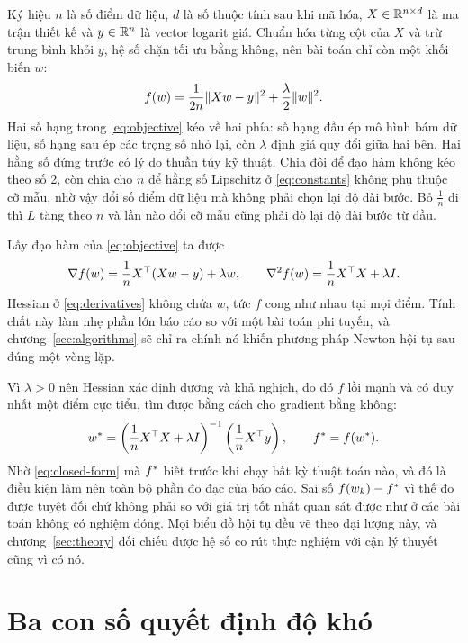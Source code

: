 Ký hiệu $n$ là số điểm dữ liệu, $d$ là số thuộc tính sau khi mã hóa,
$X \in \mathbb{R}^{n \times d}$ là ma trận thiết kế và $y \in \mathbb{R}^{n}$ là vector logarit
giá. Chuẩn hóa từng cột của $X$ và trừ trung bình khỏi $y$, hệ số chặn tối ưu
bằng không, nên bài toán chỉ còn một khối biến $w$:
%
\begin{equation}
  \label{eq:objective}
  f(w) = \frac{1}{2n} \lVert Xw - y\rVert^{2} + \frac{\lambda}{2} \lVert w\rVert^{2}.
\end{equation}
%
Hai số hạng trong \eqref{eq:objective} kéo về hai phía: số hạng đầu ép mô hình
bám dữ liệu, số hạng sau ép các trọng số nhỏ lại, còn $\lambda$ định giá quy đổi
giữa hai bên. Hai hằng số đứng trước có lý do thuần túy kỹ thuật. Chia đôi để
đạo hàm
không kéo theo số 2, còn chia cho $n$ để hằng số Lipschitz ở \eqref{eq:constants}
không phụ thuộc cỡ mẫu, nhờ vậy đổi số điểm dữ liệu mà không phải chọn lại độ dài
bước. Bỏ $\tfrac{1}{n}$ đi thì $L$ tăng theo $n$ và lần nào đổi cỡ mẫu cũng phải
dò lại độ dài bước từ đầu.

Lấy đạo hàm của \eqref{eq:objective} ta được
%
\begin{equation}
  \label{eq:derivatives}
  \nabla f(w) = \frac{1}{n} X^{\top} (Xw - y) + \lambda w,
  \qquad
  \nabla^{2} f(w) = \frac{1}{n} X^{\top} X + \lambda I.
\end{equation}
%
Hessian ở \eqref{eq:derivatives} không chứa $w$, tức $f$ cong như nhau tại mọi
điểm. Tính chất này làm nhẹ phần lớn báo cáo so với một bài toán phi tuyến, và
chương~\ref{sec:algorithms} sẽ chỉ ra chính nó khiến phương pháp Newton hội tụ
sau đúng một vòng lặp.

Vì $\lambda > 0$ nên Hessian xác định dương và khả nghịch, do đó $f$ lồi mạnh và
có duy nhất một điểm cực tiểu, tìm được bằng cách cho gradient bằng không:
%
\begin{equation}
  \label{eq:closed-form}
  w^{*} = \left( \frac{1}{n} X^{\top} X + \lambda I \right)^{-1}
           \left( \frac{1}{n} X^{\top} y \right),
  \qquad f^{*} = f(w^{*}).
\end{equation}
%
Nhờ \eqref{eq:closed-form} mà $f^{*}$ biết trước khi chạy bất kỳ thuật toán nào,
và đó là điều kiện làm nên toàn bộ phần đo đạc của báo cáo. Sai số
$f(w_k) - f^{*}$ vì thế đo được tuyệt đối chứ không phải so với giá trị tốt nhất
quan sát được như ở các bài toán không có nghiệm đóng. Mọi biểu đồ hội tụ đều vẽ
theo đại lượng này, và chương~\ref{sec:theory} đối chiếu được hệ số co rút thực
nghiệm với cận lý thuyết cũng vì có nó.

\section{Ba con số quyết định độ khó}
\label{sec:constants}

